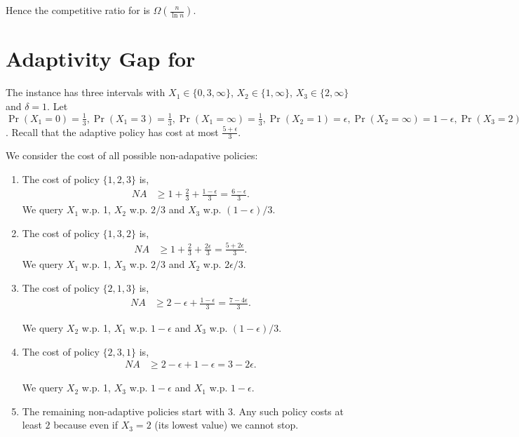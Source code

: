 \documentclass[11pt]{article}
\theoremstyle{remark}
\theoremstyle{plain}
\theoremstyle{remark}
\begin{document}
 
Hence the competitive ratio for \smq is $\Omega(\frac{n}{\ln n})$. 

 
\section{Adaptivity Gap for \smq }
\label{apx:na}

The instance has three intervals with $X_1 \in \{0, 3, \infty\} $, $X_2 \in \{1, \infty\} $, $X_3 \in \{2,  \infty\} $ and $\delta = 1$. Let  $\Pr(X_1 = 0) = \frac{1}{3}, \Pr(X_1 = 3) = \frac{1}{3}, \Pr(X_1 = \infty) = \frac{1}{3}, \Pr(X_2 = 1  ) = \epsilon,  \Pr(X_2 = \infty  ) = 1- \epsilon,  \Pr(X_3 = 2  ) = 1 - \epsilon, \Pr(X_3 = \infty) = \epsilon$. Recall that the  adaptive policy has cost at most $\frac{5+\epsilon}{3}$.


 We consider the cost of all possible non-adapative policies:
\begin{enumerate}
    \item 
  The cost of policy $\{1,2,3\}$ is,
  \begin{align*}
    NA & \geq 1 + \frac{2}{3} +  \frac{1 - \epsilon}{3} = \frac{6 -  \epsilon}{3} .
\end{align*}
    We query $X_1$ w.p. 1,  $X_2$  w.p. $2/3$ and  $X_3$  w.p. ${(1-\epsilon)}/{3}$.
    


\item 

The cost of policy $\{1,3,2\}$ is,
\begin{align*}
    NA & \geq 1 + \frac{2}{3} + \frac{2\epsilon}{3}  = \frac{5 + 2 \epsilon}{3} .
\end{align*}
    We query  $X_1$  w.p. 1,  $X_3$  w.p. $2/3$ and  $X_2$  w.p. ${2\epsilon}/{3}$.



\item 

The cost of policy $\{2,1,3\}$ is,
\begin{align*}
    NA & \geq 2 - \epsilon + \frac{1-\epsilon}{3} = \frac{7- 4\epsilon}{3}. 
\end{align*}

    We query  $X_2$   w.p. 1,  $X_1$  w.p. $1- \epsilon$ and  $X_3$  w.p. $(1 - \epsilon)/3$.


\item 

The cost of policy $\{2,3,1\}$ is,
\begin{align*}
    NA & \geq 2 - \epsilon + 1 - \epsilon = 3 - 2\epsilon .  
\end{align*}
 
    We query $X_2$ w.p. 1,  $X_3$    w.p. $1- \epsilon$ and  $X_1$ w.p. $1 - \epsilon$.




  
\item  The remaining non-adaptive policies  start with $3$. Any such policy costs at least $2$ because even if $X_3=2$ (its lowest value) we cannot stop.  


\end{enumerate}
\end{document}
